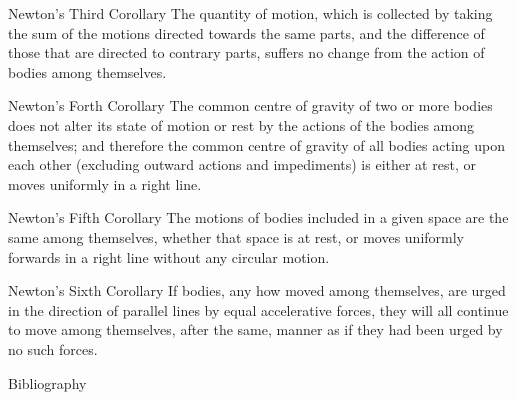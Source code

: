 \documentclass[avery5371,grid]{flashcards}
\begin{document}
\begin{flashcard}[Application]{Newton's Third Corollary}
\vspace{\fill}
The quantity of motion, which is collected by taking the sum of the motions directed towards the same parts, and the difference of those that are directed to contrary parts, suffers no change from the action of bodies among themselves.\cite{NaturalPhilosophy}
\vspace{\fill}
\end{flashcard}


\begin{flashcard}[Application]{Newton's Forth Corollary}
\vspace{\fill}
The common centre of gravity of two or more bodies does not alter its state of motion or rest by the actions of the bodies among themselves; and therefore the common centre of gravity of all bodies acting upon each other (excluding outward actions and impediments) is either at rest, or moves uniformly in a right line.\cite{NaturalPhilosophy}
\vspace{\fill}
\end{flashcard}


\begin{flashcard}[Application]{Newton's Fifth Corollary}
\vspace{\fill}
The motions of bodies included in a given space are the same among themselves, whether that space is at rest, or moves uniformly forwards in a right line without any circular motion.\cite{NaturalPhilosophy}
\vspace{\fill}
\end{flashcard}


\begin{flashcard}[Application]{Newton's Sixth Corollary}
\vspace{\fill}
If bodies, any how moved among themselves, are urged in the direction of parallel lines by equal accelerative forces, they will all continue to move among themselves, after the same, manner as if they had been urged by no such forces.\cite{NaturalPhilosophy}
\vspace{\fill}
\end{flashcard}



\begin{flashcard}[Application]{}
\vspace{\fill}

\vspace{\fill}
\end{flashcard}



\begin{flashcard}[References]{Bibliography}
    \printbibliography[]
\end{flashcard}
\end{document}

